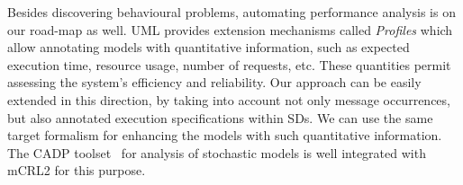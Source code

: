 \documentclass[letter]{llncs}
\newcommand{\secshrinkbegin}{\vspace{-.2cm}}
\begin{document}
Besides discovering behavioural problems, automating performance analysis is on our road-map as well.
UML provides extension mechanisms called \emph{Profiles} which allow annotating models with quantitative information,
such as expected execution time, resource usage, number of requests, etc.
These quantities permit assessing the system's efficiency and reliability. Our approach can be easily extended
in this direction, by taking into account not only message occurrences, but also annotated execution specifications
within SDs. We can use the same target formalism for enhancing the models with such quantitative information.
The CADP toolset~\cite{GaravelLMS11} for analysis of stochastic models is well integrated with mCRL2 for this
purpose.
\secshrinkbegin
 
\vspace{-8 pt}

\end{document}
